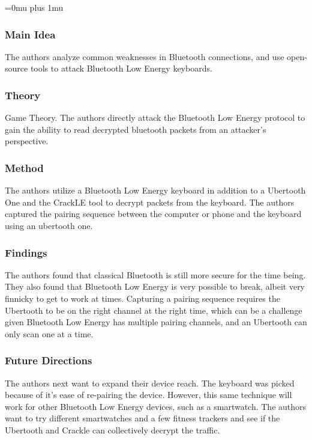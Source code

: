 \Urlmuskip=0mu plus 1mu\relax

\subsubsection{Main Idea}

\noindent
The authors analyze common weaknesses in Bluetooth connections, and use open-source tools to attack Bluetooth Low Energy keyboards.

\subsubsection{Theory}

\noindent
Game Theory.  The authors directly attack the Bluetooth Low Energy protocol to gain the ability to read decrypted bluetooth packets from an attacker's perspective.

\subsubsection{Method}

\noindent
The authors utilize a Bluetooth Low Energy keyboard in addition to a Ubertooth One and the CrackLE tool to decrypt packets from the keyboard.  The authors captured the pairing sequence between the computer or phone and the keyboard using an ubertooth one.

\subsubsection{Findings}

\noindent
The authors found that classical Bluetooth is still more secure for the time being.  They also found that Bluetooth Low Energy is very possible to break, albeit very finnicky to get to work at times.  Capturing a pairing sequence requires the Ubertooth to be on the right channel at the right time, which can be a challenge given Bluetooth Low Energy has multiple pairing channels, and an Ubertooth can only scan one at a time.

\subsubsection{Future Directions}

\noindent
The authors next want to expand their device reach.  The keyboard was picked because of it's ease of re-pairing the device.  However, this same technique will work for other Bluetooth Low Energy devices, such as a smartwatch.  The authors want to try different smartwatches and a few fitness trackers and see if the Ubertooth and Crackle can collectively decrypt the traffic.

